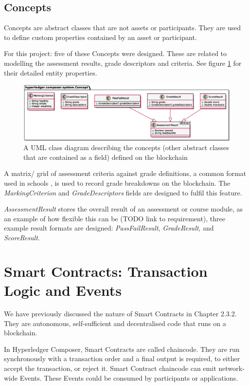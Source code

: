 \subsection{Concepts}

Concepts are abstract classes that are not assets or participants. They are used to define custom properties contained by an asset or participant.

For this project: five of these Concepts were designed. These are related to modelling the assessment results, grade descriptors and criteria.
See figure \ref{fig:concepts} for their detailed entity properties.

\begin{figure}[!ht]
	\centering
	\includegraphics[width=1.0\textwidth]{concepts}
	\caption[Concepts Class Diagram]
	{A UML class diagram describing the concepts (other abstract classes that are contained as a field) defined on the blockchain}
	\label{fig:concepts}
\end{figure}

A matrix/ grid of assessment criteria against grade definitions, a common format used in schools \citep[p.102]{bryan2006innovative},
is used to record grade breakdowns on the blockchain. The \textit{MarkingCriterion} and \textit{GradeDescriptors} fields are designed to
fulfil this feature.

\textit{AssessmentResult} stores the overall result of an assessment or course module, as an example of how flexible this can be (TODO link to requirement),
three example result formats are designed: \textit{PassFailResult}, \textit{GradeResult}, and \textit{ScoreResult}.

\section{Smart Contracts: Transaction Logic and Events}

We have previously discussed the nature of Smart Contracts in Chapter 2.3.2. They are autonomous, self-sufficient and
decentralised code that runs on a blockchain.

In Hyperledger Composer, Smart Contracts are called chaincode.
They are run synchronously with a transaction order and a final output is required, to either accept the transaction, or reject it.
Smart Contract chaincode can emit network-wide Events. These Events could be consumed by participants or applications.

